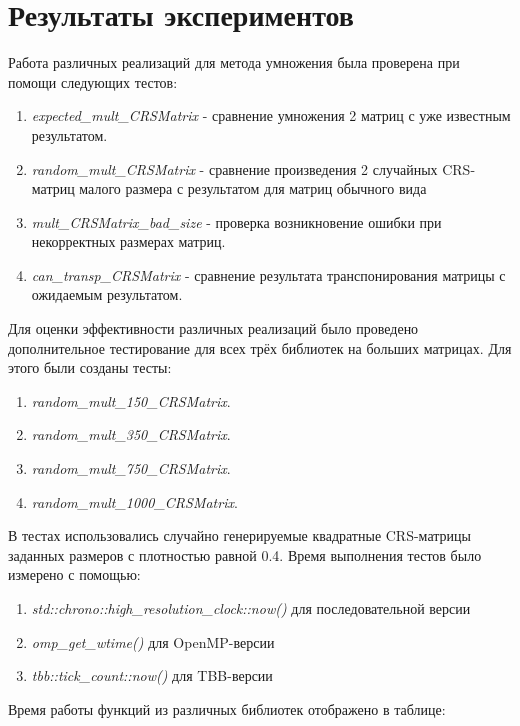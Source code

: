 \documentclass[14pt, russian]{extarticle}
\begin{document}
	\section{Результаты экспериментов}
     \indent Работа различных реализаций для метода умножения была проверена при помощи следующих тестов:
    \begin{enumerate}[topsep=0pt, labelwidth=!, labelindent=0pt]
		\item \emph{expected\_mult\_CRSMatrix} - сравнение умножения 2 матриц с уже известным результатом.
		\item \emph{random\_mult\_CRSMatrix 
		}- сравнение произведения 2 случайных CRS-матриц малого размера с результатом для матриц обычного вида
        \item \emph{mult\_CRSMatrix\_bad\_size} - проверка возникновение ошибки при некорректных размерах матриц.
		\item \emph{can\_transp\_CRSMatrix} - сравнение результата транспонирования матрицы с ожидаемым результатом.
	\end{enumerate}
    
\indent  Для оценки эффективности различных реализаций было проведено дополнительное тестирование для всех трёх библиотек на больших матрицах. Для этого были созданы тесты:
	\begin{enumerate}[topsep=0pt, labelwidth=!, labelindent=0pt]
		\item \emph{random\_mult\_150\_CRSMatrix}.
		\item \emph{random\_mult\_350\_CRSMatrix}. 
		\item \emph{random\_mult\_750\_CRSMatrix}.
		\item \emph{random\_mult\_1000\_CRSMatrix}.
	\end{enumerate}
	
 В тестах использовались случайно генерируемые квадратные CRS-матрицы заданных размеров с плотностью равной 0.4. Время выполнения тестов было измерено с помощью: 
  \begin{enumerate}
                \item \emph {std::chrono::high\_resolution\_clock::now()} для последовательной версии
               \item \emph{omp\_get\_wtime()} для OpenMP-версии
                \item \emph{tbb::tick\_count::now()} для TBB-версии
    \end{enumerate}
    \indent          
     \indent  Время работы функций из различных библиотек отображено в таблице:
	
\end{document}
